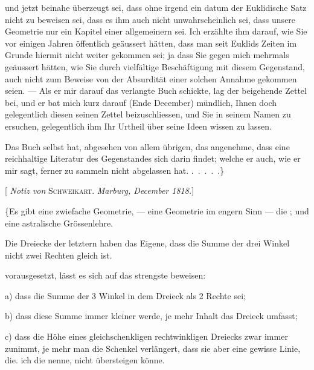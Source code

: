 und jetzt beinahe überzeugt sei, dass ohne irgend ein datum der Euklidische Satz nicht zu beweisen sei, dass es ihm auch nicht unwahrscheinlich sei, dass unsere Geometrie nur ein Kapitel einer allgemeinern sei. Ich erzählte ihm darauf, wie Sie vor einigen Jahren öffentlich geäussert hätten, dass man seit Euklids Zeiten im Grunde hiermit nicht weiter gekommen sei; ja dass Sie gegen mich mehrmals geäussert hätten, wie Sie durch vielfältige Beschäftigung mit diesem Gegenstand, auch nicht zum Beweise von der Absurdität einer solchen Annahme gekommen seien. --- Als er mir darauf das verlangte Buch schickte, lag der beigehende Zettel bei, und er bat mich kurz darauf (Ende December) mündlich, Ihnen doch gelegentlich diesen seinen Zettel beizuschliessen, und Sie in seinem Namen zu ersuchen, gelegentlich ihm Ihr Urtheil über seine Ideen wissen zu lassen.

Das Buch selbst hat, abgesehen von allem übrigen, das angenehme, dass eine reichhaltige Literatur des Gegenstandes sich darin findet; welche er auch, wie er mir sagt, ferner zu sammeln nicht abgelassen hat. .\ .\ .\ .\ .\}

\bigskip
\noindent\hrulefill
\bigskip

\begin{center}[\emph{ Notiz von} \textsc{Schweikart}. \emph{Marburg, December 1818.}]\end{center}

\{Es gibt eine zwiefache Geometrie, --- eine Geometrie im engern Sinn --- die ; und eine astralische Grössenlehre.

Die Dreiecke der letztern haben das Eigene, dass die Summe der drei Winkel nicht zwei Rechten gleich ist.

 vorausgesetzt, lässt es sich auf das strengste beweisen:

a) dass die Summe der 3 Winkel in dem Dreieck  als 2 Rechte sei;

b) dass diese Summe immer kleiner werde, je mehr Inhalt das Dreieck umfasst;

c) dass die Höhe eines gleichschenkligen rechtwinkligen Dreiecks zwar immer zunimmt, je mehr man die Schenkel verlängert, dass sie aber eine gewisse Linie, die. ich die  nenne, nicht übersteigen könne.

